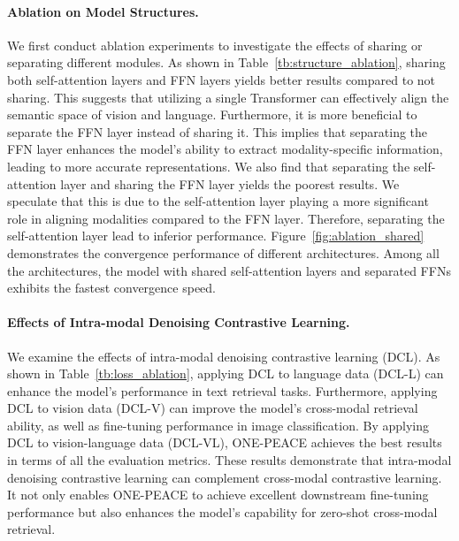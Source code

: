 \documentclass{article}
\newcommand{\onepeace}{ONE-PEACE\xspace}
\begin{document}
\paragraph{Ablation on Model Structures.}
We first conduct ablation experiments to investigate the effects of sharing or separating different modules.
As shown in Table~\ref{tb:structure_ablation}, sharing both self-attention layers and FFN layers yields better results compared to not sharing. This suggests that utilizing a single Transformer can effectively align the semantic space of vision and language.
Furthermore, it is more beneficial to separate the FFN layer instead of sharing it. This implies that separating the FFN layer enhances the model's ability to extract modality-specific information, leading to more accurate representations.
We also find that separating the self-attention layer and sharing the FFN layer yields the poorest results. We speculate that this is due to the self-attention layer playing a more significant role in aligning modalities compared to the FFN layer. Therefore, separating the self-attention layer lead to inferior performance.
Figure~\ref{fig:ablation_shared} demonstrates the convergence performance of different architectures. 
Among all the architectures, the model with shared self-attention layers and separated FFNs exhibits the fastest convergence speed.

\paragraph{Effects of Intra-modal Denoising Contrastive Learning.}
We examine the effects of intra-modal denoising contrastive learning (DCL).
As shown in Table~\ref{tb:loss_ablation}, applying DCL to language data (DCL-L) can enhance the model's performance in text retrieval tasks.
Furthermore, applying DCL to vision data (DCL-V) can improve the model's cross-modal retrieval ability, as well as fine-tuning performance in image classification. 
By applying DCL to vision-language data (DCL-VL), \onepeace achieves the best results in terms of all the evaluation metrics. 
These results demonstrate that intra-modal denoising contrastive learning can complement cross-modal contrastive learning.
It not only enables \onepeace to achieve excellent downstream fine-tuning performance but also enhances the model's capability for zero-shot cross-modal retrieval.
\end{document}
